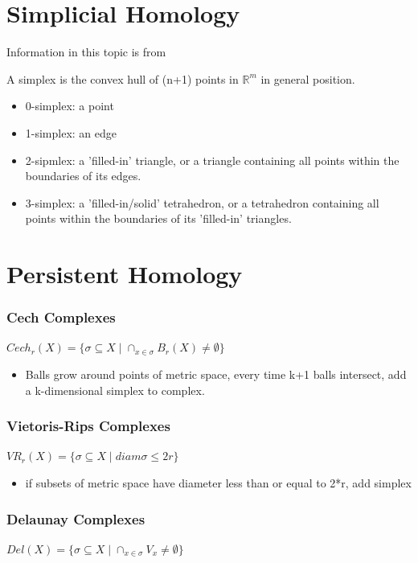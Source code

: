 \documentclass[ma]{uncgdissertationexp}
\theoremstyle{plain}
\theoremstyle{definition}
\theoremstyle{remark}
\begin{document}
\section{Simplicial Homology}

Information in this topic is from \cite{Hatcher_2001}

A simplex is the convex hull of (n+1) points in $\mathbb{R}^{m}$ in general position.
\begin{itemize}
\item 0-simplex: a point
\item 1-simplex: an edge
\item 2-sipmlex: a 'filled-in' triangle, or a triangle containing all points within the boundaries of its edges.
\item 3-simplex: a 'filled-in/solid' tetrahedron, or a tetrahedron containing all points within the boundaries of its 'filled-in' triangles.
\end{itemize}

\section{Persistent Homology}

\subsubsection{Cech Complexes}
$Cech_{r}(X) = \{\sigma \subseteq X \mid \cap_{x \in \sigma} B_{r}(X) \not= \emptyset\}$
\begin{itemize}
\item Balls grow around points of metric space, every time k+1 balls intersect, add a k-dimensional simplex to complex.
\end{itemize}

\subsubsection{Vietoris-Rips Complexes}
$VR_{r}(X) = \{\sigma \subseteq X \mid diam\sigma \leq 2r \}$
\begin{itemize}
\item if subsets of metric space have diameter less than or equal to 2*r, add simplex
\end{itemize}

\subsubsection{Delaunay Complexes}
$Del(X) = \{\sigma \subseteq X \mid \cap_{x \in \sigma} V_{x} \not= \emptyset\}$
\end{document}
